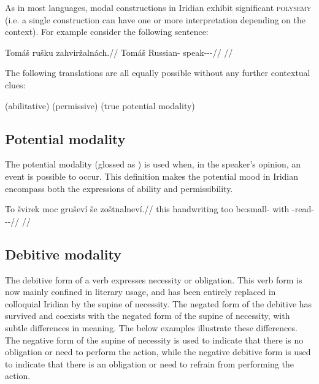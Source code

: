 As in most languages, modal constructions in Iridian exhibit significant
{\scshape polysemy} (i.e. a single construction can have one or
more interpretation depending on the context). For example consider the
following sentence:

\pex
\begingl
\gla Tomáš rušku zahviržalnách.//
\glb Tomáš Russian-\Ins{} speak-\Av{}-\Pot{}-\Ctp{}//
\glft {}//
\endgl
\xe

The following translations are all equally possible without any further
contextual clues:

\pex
\a {} (abilitative)
\a {} (permissive)
\a {} (true potential modality)
\xe


\subsection{Potential modality}\label{sec:potential}

The potential modality (glossed as \Pot{}) is used when, in the speaker's
opinion, an event is possible to occur. This definition makes the potential mood
in Iridian encompass both the expressions of ability and permissibility.

\pex
\begingl
\gla To švirek moc gruševí še zoštnalneví.//
\glb this handwriting too be:small-\Cont{} with \Neg{}-read-\Pv{}-\Pot{}-\Cont{}//
\glft {}//
\endgl
\xe

\subsection{Debitive modality}\label{sec:debitive}

The debitive form of a verb expresses necessity or obligation. This verb form is
now mainly confined in literary usage, and has been entirely replaced in
colloquial Iridian by the supine of necessity. The negated form of
the debitive has survived and coexists with the negated form of the supine of
necessity, with subtle differences in meaning. The below examples illustrate
these differences. The negative form of the supine of necessity is used to
indicate that there is no obligation or need to perform the action, while the
negative debitive form is used to indicate that there is an obligation or need
to refrain from performing the action.

